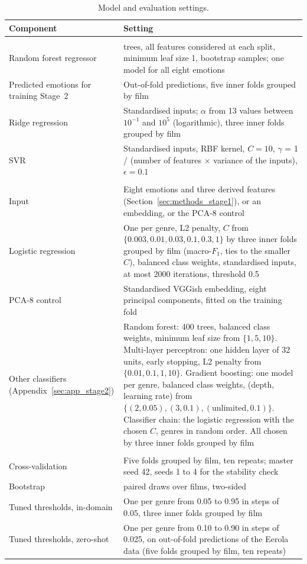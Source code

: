 \begin{table}[H]
  \centering
  \small
  \caption{Model and evaluation settings.}
  \label{tab:app_config}
  \begin{tabular}{@{}>{\raggedright\arraybackslash}p{}>{\raggedright\arraybackslash}p{}@{}}
    \toprule
    Component & Setting \\
    \midrule
    \multicolumn{2}{@{}l}{\textit{Stage 1: emotions from audio}} \\
    Random forest regressor & 300 trees, all features considered at each split, minimum leaf size 1, bootstrap samples; one model for all eight emotions \\
    Predicted emotions for training Stage~2 & Out-of-fold predictions, five inner folds grouped by film \\
    Ridge regression & Standardised inputs; $\alpha$ from 13 values between $10^{-1}$ and $10^{5}$ (logarithmic), three inner folds grouped by film \\
    SVR & Standardised inputs, RBF kernel, $C=10$, $\gamma$ = 1 / (number of features $\times$ variance of the inputs), $\epsilon=0.1$ \\
    \midrule
    \multicolumn{2}{@{}l}{\textit{Stage 2: genre}} \\
    Input & Eight emotions and three derived features (Section~\ref{sec:methods_stage1}), or an embedding, or the PCA-8 control \\
    Logistic regression & One per genre, L2 penalty, $C$ from $\{0.003, 0.01, 0.03, 0.1, 0.3, 1\}$ by three inner folds grouped by film (macro-$F_1$, ties to the smaller $C$), balanced class weights, standardised inputs, at most 2000 iterations, threshold 0.5 \\
    PCA-8 control & Standardised VGGish embedding, eight principal components, fitted on the training fold \\
    Other classifiers (Appendix~\ref{sec:app_stage2}) & Random forest: 400 trees, balanced class weights, minimum leaf size from $\{1, 5, 10\}$. Multi-layer perceptron: one hidden layer of 32 units, early stopping, L2 penalty from $\{0.01, 0.1, 1, 10\}$. Gradient boosting: one model per genre, balanced class weights, (depth, learning rate) from $\{(2, 0.05), (3, 0.1), (\text{unlimited}, 0.1)\}$. Classifier chain: the logistic regression with the chosen $C$, genres in random order. All chosen by three inner folds grouped by film \\
    \midrule
    \multicolumn{2}{@{}l}{\textit{Evaluation}} \\
    Cross-validation & Five folds grouped by film, ten repeats; master seed 42, seeds 1 to 4 for the stability check \\
    Bootstrap & 2000 paired draws over films, two-sided \\
    Tuned thresholds, in-domain & One per genre from 0.05 to 0.95 in steps of 0.05, three inner folds grouped by film \\
    Tuned thresholds, zero-shot & One per genre from 0.10 to 0.90 in steps of 0.025, on out-of-fold predictions of the Eerola data (five folds grouped by film, ten repeats) \\
    \bottomrule
  \end{tabular}
\end{table}
